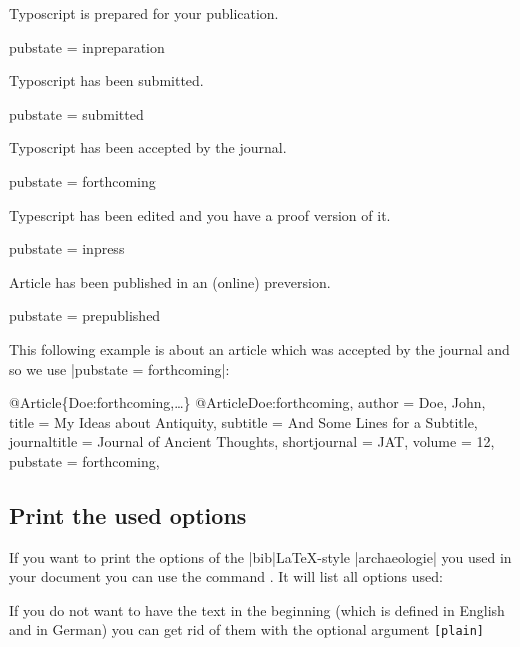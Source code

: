\documentclass[a4paper,
10pt,
greek,
french,
spanish,
italian,
ngerman,
english,
]{ltxdoc}
\begin{document}
Typoscript is prepared for your publication. 
\begin{code}
pubstate = {inpreparation}
\end{code}

Typoscript has been submitted.
\begin{code}
pubstate = {submitted}
\end{code}

Typoscript has been accepted by the journal.
\begin{code}
pubstate = {forthcoming}
\end{code}

Typescript has been edited and you have a proof version of it.
\begin{code}
pubstate = {inpress}
\end{code}

Article has been published in an (online) preversion.
\begin{code}
pubstate = {prepublished}
\end{code}


This following example is about an article which was accepted by the journal and so we use |pubstate = {forthcoming}|:
\begin{bibexample}[label=Doe:forthcoming]{{@}Article\{Doe:forthcoming,…\}}
@Article{Doe:forthcoming,
  author       = {Doe, John},
  title        = {My Ideas about Antiquity},
  subtitle     = {And Some Lines for a Subtitle},
  journaltitle = {Journal of Ancient Thoughts},
  shortjournal = {JAT},
  volume       = {12},
  pubstate     = {forthcoming},
}
\end{bibexample}



\subsection{Print the used options}
If you want to print the options  of the |bib|\LaTeX -style |archaeologie| you used in your document you can use the command .
It will list all options used:
\begin{otherlanguage}{ngerman}
\begin{example}
\archaeologieoptions
\end{example}
\end{otherlanguage}
\begin{example}
\archaeologieoptions
\end{example}
If you do not want to have the text in the beginning (which is defined in English and in German) you can get rid of them with the optional argument  \texttt{[plain]}
\begin{example}
\archaeologieoptions[plain]
\end{example}
\begin{otherlanguage}{ngerman}
\begin{example}
\archaeologieoptions[plain]
\end{example}
\end{otherlanguage}
\end{document}
